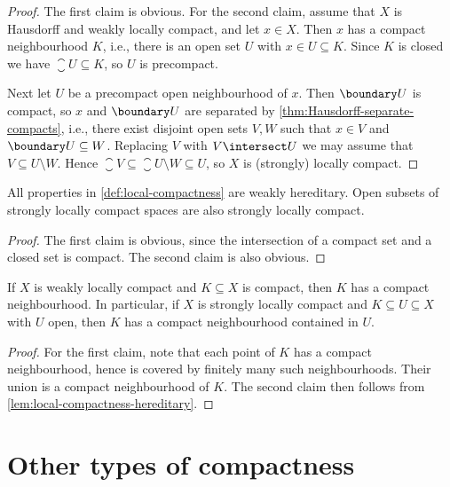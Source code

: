 \documentclass[article, a4paper, 11pt, oneside]{memoir}
\numberwithin{equation}{chapter}
\begin{document}
\begin{proof}
    The first claim is obvious. For the second claim, assume that $X$ is Hausdorff and weakly locally compact, and let $x \in X$. Then $x$ has a compact neighbourhood $K$, i.e., there is an open set $U$ with $x \in U \subseteq K$. Since $K$ is closed we have $\closure{U} \subseteq K$, so $U$ is precompact.

    Next let $U$ be a precompact open neighbourhood of $x$. Then $\boundary U$ is compact, so $x$ and $\boundary U$ are separated by \cref{thm:Hausdorff-separate-compacts}, i.e., there exist disjoint open sets $V,W$ such that $x \in V$ and $\boundary U \subseteq W$. Replacing $V$ with $V \intersect U$ we may assume that $V \subseteq U \setminus W$. Hence $\closure{V} \subseteq \closure{U} \setminus W \subseteq U$, so $X$ is (strongly) locally compact.
\end{proof}


\begin{lemma}
    \label{lem:local-compactness-hereditary}
    All properties in \cref{def:local-compactness} are weakly hereditary. Open subsets of strongly locally compact spaces are also strongly locally compact.
\end{lemma}

\begin{proof}
    The first claim is obvious, since the intersection of a compact set and a closed set is compact. The second claim is also obvious.
\end{proof}


\begin{lemma}
    \label{thm:LCH-compact-set-has-compact-nhood}
    If $X$ is weakly locally compact and $K \subseteq X$ is compact, then $K$ has a compact neighbourhood. In particular, if $X$ is strongly locally compact and $K \subseteq U \subseteq X$ with $U$ open, then $K$ has a compact neighbourhood contained in $U$.
\end{lemma}

\begin{proof}
    For the first claim, note that each point of $K$ has a compact neighbourhood, hence is covered by finitely many such neighbourhoods. Their union is a compact neighbourhood of $K$. The second claim then follows from \cref{lem:local-compactness-hereditary}.
\end{proof}


\section{Other types of compactness}
\end{document}

